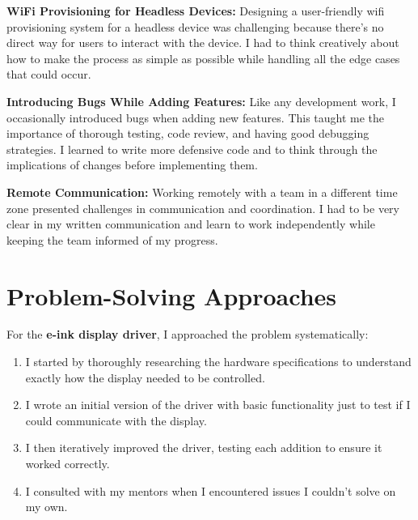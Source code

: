 \documentclass[12pt,a4paper]{report}
\begin{document}
\vspace{0.3cm}

\textbf{WiFi Provisioning for Headless Devices:} Designing a user-friendly wifi provisioning system for a headless device was challenging because there's no direct way for users to interact with the device. I had to think creatively about how to make the process as simple as possible while handling all the edge cases that could occur.

\vspace{0.3cm}

\textbf{Introducing Bugs While Adding Features:} Like any development work, I occasionally introduced bugs when adding new features. This taught me the importance of thorough testing, code review, and having good debugging strategies. I learned to write more defensive code and to think through the implications of changes before implementing them.

\vspace{0.3cm}

\textbf{Remote Communication:} Working remotely with a team in a different time zone presented challenges in communication and coordination. I had to be very clear in my written communication and learn to work independently while keeping the team informed of my progress.

\section{Problem-Solving Approaches}

For the \textbf{e-ink display driver}, I approached the problem systematically:

\begin{enumerate}[itemsep=0.2cm]
    \item I started by thoroughly researching the hardware specifications to understand exactly how the display needed to be controlled.
    \item I wrote an initial version of the driver with basic functionality just to test if I could communicate with the display.
    \item I then iteratively improved the driver, testing each addition to ensure it worked correctly.
    \item I consulted with my mentors when I encountered issues I couldn't solve on my own.
\end{enumerate}

\vspace{0.3cm}
\end{document}
